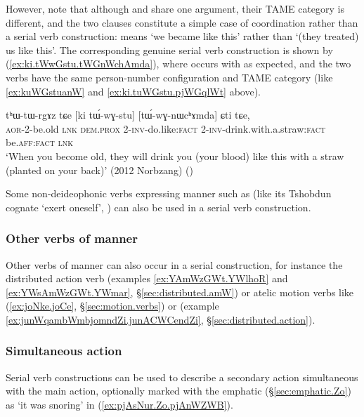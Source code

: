 However, note that although  and  share one argument, their TAME category is different, and the two clauses constitute a simple case of coordination rather than a serial verb construction:  means `we became like this' rather than `(they treated) us like this'. The corresponding genuine serial verb construction is shown by (\ref{ex:ki.tWwGstu.tWGnWchAmda}), where  occurs with  as expected, and the two verbs have the same person-number configuration and TAME category (like \ref{ex:kuWGstuanW} and \ref{ex:ki.tuWGstu.pjWGqlWt} above).

\begin{exe}
\ex   \label{ex:ki.tWwGstu.tWGnWchAmda}
\gll tʰɯ-tɯ-rgɤz tɕe [ki tɯ́-wɣ-stu] [tɯ́-wɣ-nɯcʰɤmda] ɕti tɕe, \\
\textsc{aor}-2-be.old \textsc{lnk} \textsc{dem}.\textsc{prox} 2-\textsc{inv}-do.like:\textsc{fact} 2-\textsc{inv}-drink.with.a.straw:\textsc{fact} be.\textsc{aff}:\textsc{fact} \textsc{lnk} \\
\glt `When you become old, they will drink you (your blood) like this with a straw (planted on your back)' (2012 Norbzang)
()
\end{exe}

Some non-deideophonic verbs expressing manner such as  (like its Tshobdun cognate  `exert oneself', \citealt[490--491]{sun12complementation}) can also be used in a serial verb construction.

\subsubsection{Other verbs of manner} \label{sec:svc.manner.other}
Other verbs of manner can also occur in a serial construction, for instance the distributed action verb  (examples \ref{ex:YAmWzGWt.YWlhoR} and \ref{ex:YWsAmWzGWt.YWmar}, §\ref{sec:distributed.amW}) or atelic motion verbs like  (\ref{ex:joNke.joCe}, §\ref{sec:motion.verbs}) or   (example \ref{ex:junWqambWmbjomndZi.junACWCendZi}, §\ref{sec:distributed.action}).

\subsubsection{Simultaneous action} \label{sec:svc.simultaneous}
Serial verb constructions can be used to describe a secondary action simultaneous with the main action, optionally marked with the emphatic  (§\ref{sec:emphatic.Zo}) as  `it was snoring' in (\ref{ex:pjAsNur.Zo.pjAnWZWB}).

